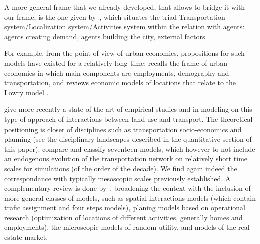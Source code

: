 \documentclass[10pt]{article}
\begin{document}
A more general frame that we already developed, that allows to bridge it with our frame, is the one given by~\cite{le2010approche}, which situates the triad Transportation system/Localization system/Activities system within the relation with agents: agents creating demand, agents building the city, external factors.

For example, from the point of view of urban economics, propositions for such models have existed for a relatively long time: \cite{putman1975urban} recalls the frame of urban economics in which main components are employments, demography and transportation, and reviews economic models of locations that relate to the Lowry model \cite{lowry1964model}.



\cite{wegener2004land} give more recently a state of the art of empirical studies and in modeling on this type of approach of interactions between land-use and transport. The theoretical positioning is closer of disciplines such as transportation socio-economics and planning (see the disciplinary landscapes described in the quantitative section of this paper). \cite{wegener2004land} compare and classify seventeen models, which however to not include an endogenous evolution of the transportation network on relatively short time scales for simulations (of the order of the decade). We find again indeed the correspondance with typically mesoscopic scales previously established. A complementary review is done by~\cite{chang2006models}, broadening the context with the inclusion of more general classes of models, such as spatial interactions models (which contain trafic assignment and four steps models), planing models based on operational research (optimization of locations of different activities, generally homes and employments), the microscopic models of random utility, and models of the real estate market.
\end{document}
